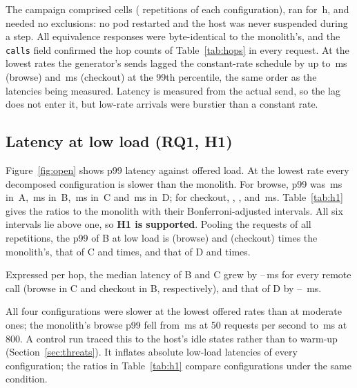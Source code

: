 The campaign comprised  cells ( repetitions of each configuration), ran for \,h,
and needed no exclusions: no pod restarted and the host was never suspended during a step. All
 equivalence responses were byte-identical to the monolith's, and the \texttt{calls} field
confirmed the hop counts of Table~\ref{tab:hops} in every request. At the lowest rates the generator's sends lagged
the constant-rate schedule by up to \,ms (browse) and \,ms (checkout) at the
99th percentile, the same order as the latencies being measured. Latency is measured from the actual send, so the
lag does not enter it, but low-rate arrivals were burstier than a constant rate.

\subsection{Latency at low load (RQ1, H1)}
\label{sec:res-latency}

Figure~\ref{fig:open} shows p99 latency against offered load. At the lowest rate every decomposed configuration
is slower than the monolith. For browse, p99 was \,ms in~A, \,ms in~B,
\,ms in~C and \,ms in~D; for checkout, ,
,  and \,ms. Table~\ref{tab:h1} gives the
ratios to the monolith with their Bonferroni-adjusted intervals. All six intervals lie above one, so
\textbf{H1 is supported}. Pooling the requests of all repetitions, the p99 of B at low load is  (browse) and
 (checkout) times the monolith's, that of C  and
 times, and that of D  and 
times.

Expressed per hop, the median latency of B and C grew by --\,ms
for every remote call (browse in C and checkout in B, respectively), and that of D by --%
\,ms.

All four configurations were slower at the lowest offered rates than at moderate ones; the monolith's browse p99
fell from \,ms at 50 requests per second to \,ms at 800. A control run
traced this to the host's idle states rather than to warm-up (Section~\ref{sec:threats}). It inflates absolute
low-load latencies of every configuration; the ratios in Table~\ref{tab:h1} compare configurations under the same
condition.

